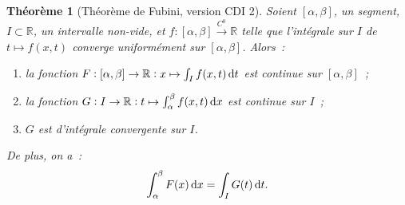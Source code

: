 \documentclass{report}
\newtheorem{thm}{Théorème}[chapter]
\theoremstyle{definition}
\theoremstyle{remark}
\numberwithin{equation}{section}
\newcommand{\R}{\mathbb R}
\newcommand{\toC}[1]{\xrightarrow{C^{#1}}}
\newcommand{\tocont}{\toC 0}
\newcommand{\CDIII}{{CDI 2}}
\begin{document}
			\begin{thm}[Théorème de Fubini, version \CDIII]\label{thm:FubiniCDI1} Soient $[\alpha, \beta]$, un segment, $I \subset \R$, un intervalle non-vide, et
			$f : [\alpha, \beta] \tocont \R$ telle que l'intégrale sur $I$ de $t \mapsto f(x, t)$ converge uniformément sur $[\alpha, \beta]$. Alors~:
			\begin{enumerate}
				\item la fonction $F : [\alpha, \beta] \to \R : x \mapsto \int_I f(x, t)\dif t$ est continue sur $[\alpha, \beta]$~;
				\item la fonction $G : I \to \R : t \mapsto \int_\alpha^\beta f(x, t)\dif x$ est continue sur $I$~;
				\item $G$ est d'intégrale convergente sur $I$.
			\end{enumerate}

			De plus, on a~:
			\begin{equation}
				\int_\alpha^\beta F(x)\dif x = \int_I G(t)\dif t.
			\end{equation}
			\end{thm}
\end{document}
